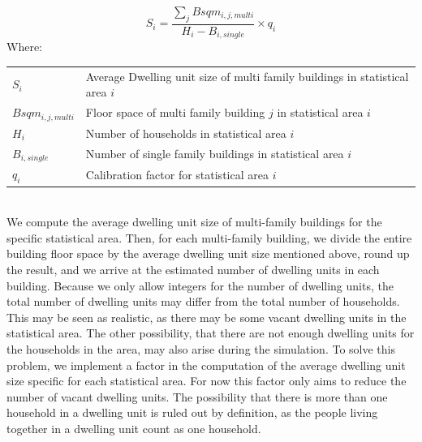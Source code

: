 \documentclass[11pt]{IJM-article}
\begin{document}
\parbox{\textwidth}{ 
    \begin{equation} 
    \label{eq:4} 
        S_{i} = \frac{\sum_{j}Bsqm_{i,j,multi}}{H_{i} - B_{i,single}} 
            \times q_{i}
    \end{equation} 
    \noindent Where:\\ 
    \vspace{.5cm}
    \begin{tabular}{l l} 
        $S_{i}$ & Average Dwelling unit size of multi family buildings in 
            statistical area $i$\\ 
        $Bsqm_{i,j,multi}$ & Floor space of multi family building ${j}$ in 
            statistical area $i$\\ 
        $H_{i}$ & Number of households in statistical area ${i}$\\ 
        $B_{i,single}$ & Number of single family buildings in statistical 
            area $i$\\ 
        $q_i$ & Calibration factor for statistical area $i$
    \end{tabular} 
}\\

We compute the average dwelling unit size of multi-family buildings for the
specific statistical area. Then, for each multi-family building, we divide the
entire building floor space by the average dwelling unit size mentioned above,
round up the result, and we arrive at the estimated number of dwelling units in
each building. Because we only allow integers for the number of dwelling units,
the total number of dwelling units may differ from the total number of
households. This may be seen as realistic, as there may be some vacant dwelling
units in the statistical area. The other possibility, that there are not enough
dwelling units for the households in the area, may also arise during the
simulation. To solve this problem, we implement a factor in the computation of
the average dwelling unit size specific for each statistical area. For now this
factor only aims to reduce the number of vacant dwelling units. The possibility
that there is more than one household in a dwelling unit is ruled out by
definition, as the people living together in a dwelling unit count as one
household.\\
\end{document}
